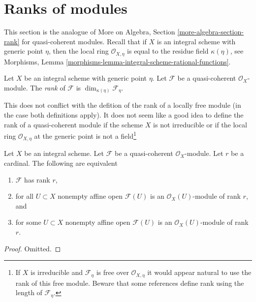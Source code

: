 \section{Ranks of modules}
\label{section-rank}

\noindent
This section is the analogue of
More on Algebra, Section \ref{more-algebra-section-rank}
for quasi-coherent modules.
Recall that if $X$ is an integral scheme with generic point $\eta$,
then the local ring $\mathcal{O}_{X, \eta}$ is equal to the
residue field $\kappa(\eta)$, see
Morphisms, Lemma \ref{morphisms-lemma-integral-scheme-rational-functions}.

\begin{definition}
\label{definition-rank}
Let $X$ be an integral scheme with generic point $\eta$.
Let $\mathcal{F}$ be a quasi-coherent $\mathcal{O}_X$-module.
The {\it rank} of $\mathcal{F}$ is $\dim_{\kappa(\eta)} \mathcal{F}_\eta$.
\end{definition}

\noindent
This does not conflict with the defition of the rank of a locally free module
(in the case both definitions apply). It does not seem like a good idea
to define the rank of a quasi-coherent module if the scheme $X$
is not irreducible or if the local ring $\mathcal{O}_{X, \eta}$
at the generic point is not a field\footnote{If $X$ is irreducible and
$\mathcal{F}_\eta$ is free over $\mathcal{O}_{X, \eta}$ it would appear
natural to use the rank of this free module. Beware that some references
define rank using the length of $\mathcal{F}_\eta$.}

\begin{lemma}
\label{lemma-check-rank-on-affines}
Let $X$ be an integral scheme. Let $\mathcal{F}$ be a quasi-coherent
$\mathcal{O}_X$-module. Let $r$ be a cardinal. The following are equivalent
\begin{enumerate}
\item $\mathcal{F}$ has rank $r$,
\item for all $U \subset X$ nonempty affine open $\mathcal{F}(U)$
is an $\mathcal{O}_X(U)$-module of rank $r$, and
\item for some $U \subset X$ nonempty affine open $\mathcal{F}(U)$
is an $\mathcal{O}_X(U)$-module of rank $r$.
\end{enumerate}
\end{lemma}

\begin{proof}
Omitted.
\end{proof}

